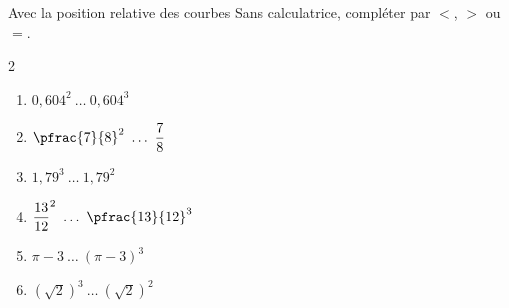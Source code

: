 \begin{exo}{Avec la position relative des courbes}
	Sans calculatrice, compléter par $<$, $>$ ou $=$.
	\vspace*{-2mm}
	\begin{multicols}{2}
		\begin{enumerate}[itemsep=2mm]
			\item $0,604^2 \ \dots \ 0,604^3$
			\item $\pfrac{7}{8}^2 \ \dots \ \dfrac{7}{8}$
			\item $1,79^3 \ \dots \ 1,79^2$
			\item $\dfrac{13}{12}^2 \ \dots \ \pfrac{13}{12}^3$
			\item $\pi - 3 \ \dots \ (\pi - 3)^3$
			\item $(\sqrt{2})^3 \ \dots \ (\sqrt{2})^2$
		\end{enumerate}
	\end{multicols}\vspace*{-2mm}
\end{exo}
